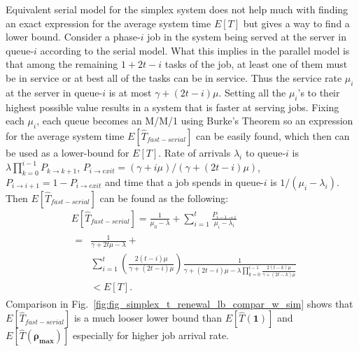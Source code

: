 \documentclass[sigconf,draft]{acmart}
\begin{document}
Equivalent serial model for the simplex system does not help much with finding an exact expression for the average system time $E[T]$ but gives a way to find a lower bound. Consider a phase-$i$ job in the system being served at the server in queue-$i$ according to the serial model. What this implies in the parallel model is that among the remaining $1+2t-i$ tasks of the job, at least one of them must be in service or at best all of the tasks can be in service. Thus the service rate $\mu_i$ at the server in queue-$i$ is at most $\gamma + (2t-i)\mu$. Setting all the $\mu_i$'s to their highest possible value results in a system that is faster at serving jobs. Fixing each $\mu_i$, each queue becomes an M/M/1 using Burke's Theorem so an expression for the average system time $E[\hat{T}_{fast-serial}]$ can be easily found, which then can be used as a lower-bound for $E[T]$. Rate of arrivals $\lambda_i$ to queue-$i$ is $\lambda\prod_{k=0}^{i-1}P_{k \rightarrow k+1}$, $P_{i \rightarrow exit} = (\gamma+i\mu)/(\gamma+(2t-i)\mu)$, $P_{i \rightarrow i+1} = 1 - P_{i \rightarrow exit}$ and time that a job spends in queue-$i$ is $1/(\mu_i-\lambda_i)$. Then $E[\hat{T}_{fast-serial}]$ can be found as the following:
\begin{equation}
  \begin{split}
    & E[\hat{T}_{fast-serial}] = \frac{1}{\mu_0-\lambda} + \sum_{i=1}^{t} \frac{P_{i-1 \rightarrow i}}{\mu_i-\lambda_i} \\
    & \begin{split}
      =& \frac{1}{\gamma+2t\mu-\lambda} + \\
      & \sum_{i=1}^{t} (\frac{2(t-i)\mu}{\gamma + (2t-i)\mu}) \frac{1}{\gamma + (2t-i)\mu - \lambda\prod_{k=0}^{i-1} \frac{2(t-k)\mu}{\gamma + (2t-k)\mu}} \\
      &< E[T].
    \end{split}
  \end{split}
\end{equation}
Comparison in Fig.~\ref{fig:fig_simplex_t_renewal_lb_compar_w_sim} shows that $E[\hat{T}_{fast-serial}]$ is a much looser lower bound than $E[\hat{T}(\bm{1})]$ and $E[\hat{T}(\bm{\rho_{max}})]$ especially for higher job arrival rate.

\end{document}
